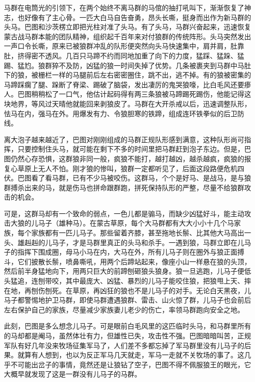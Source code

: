 \par 马群在电筒光的引领下，在两个始终不离马群的马倌的抽打吼叫下，渐渐恢复了神志，也好像有了主心骨。一匹大白马自告奋勇，昂头长嘶，挺身而出作为新马群的头马。巴图和沙茨楞立即把光柱对准了头马。有了头马，马群兴奋起来，迅速恢复蒙古战马群本能的团队精神，组织起千百年来对付狼群的传统阵形。头马突然发出一声口令长嘶，原来已被狼群冲乱的队形便突然向头马快速集中，肩并肩，肚靠肚，挤得密不透风。几百只马蹄不约而同地加重了向下的力度，猛踩、猛跺、猛踢、猛尥。狼群猝不及防，凶猛的狼一时间失掉了优势。几条被裹夹到马群中马肚下的狼，被栅栏一样的马腿前后左右密密圈住，跳不出，逃不掉。有的狼被密集的马蹄踩瘸了腿、跺断了脊梁、踢破了脑袋，发出凄厉的鬼哭狼嚎，比白毛风还要瘆人。巴图稍稍松了一口气，他估计起码得有两三条狼被马蹄踢死踢伤，他能记得这块地界，等风过天晴他就能回来剥狼皮了。马群在大开杀戒以后，迅速调整队形，怯马在内，强马在外。用爆发有力、令狼胆寒的铁蹄，组成连环铁拳似的后卫防线。
\par 离大泡子越来越近了，巴图对刚刚组成的马群正规队形感到满意，这种队形尚可指挥，只要控制住头马，就可能在剩下不多的时间里把马群赶到泡子东边。但是，巴图仍然心存恐惧，这群狼非同一般，疯狼不能打，越打越凶，越杀越疯，疯狼的报复心草原上无人不怕。刚才狼的惨叫，狼群一定都听见了，后面这段路便危机四伏。巴图看了看马群，已有不少马被咬伤。这群马，个个是好马、是战马，是与狼群搏杀出来的马，就是伤马也拼命跟群跑，拼死保持队形的严整，尽量不给狼群攻击的机会。
\par 可是，这群马却有一个致命的弱点，一色儿都是骟马，而缺少凶猛好斗，能主动攻击大狼的儿马子（雄种马）。在蒙古草原，每个大马群都有大大小小十几个马家族，每个家族都有一匹儿马子。那些留着齐膝，甚至拖地长鬃、比其他大马高出一头、雄赳赳的儿马子，才是马群里真正的头马和杀手。一遇到狼，马群立即在儿马子的指挥下围成圈，母马小马在内，大马在外，所有儿马子则在圈外与狼正面搏斗，它们披散长鬃，喷鼻嘶吼，用两个后蹄站起来，像座小山一样悬在狼的头顶，然后前半身猛地向下，用两只巨大的前蹄刨砸狼头狼身。狼一旦逃跑，儿马子便低头猛追，连刨带咬，其中最庞大、凶猛、暴烈的儿马子能咬住狼，把狼甩上天、摔在地，再刨伤刨死。在草原，再凶狂的狼也不是儿马子的对手。无论白天黑夜，儿马子都警惕地护卫马群，即使马群遭遇狼群、雷击、山火惊了群，儿马子也会前后左右保护自己的家族，尽量减少家族妻儿老少的伤亡，率领马群跑向安全之地。
\par 此刻，巴图是多么想念儿马子。可是眼前白毛风里的这匹临时头马，和马群里所有的马却都是阉马，虽然体壮有力，但雄性已失，攻击性不强。巴图暗暗叫苦，正规军队有好几年没来牧场征集军马了，人们差不多都忘掉了军马群里没有儿马子的后果。就算有人想到，也以为反正军马几天就走，军马一走就不关牧场的事了。这几乎不可能出岔子的事情，竟然还是让狼钻了空子，巴图不得不佩服狼王的眼光，它大概早就发现了这是一群没有儿马子的马群。
